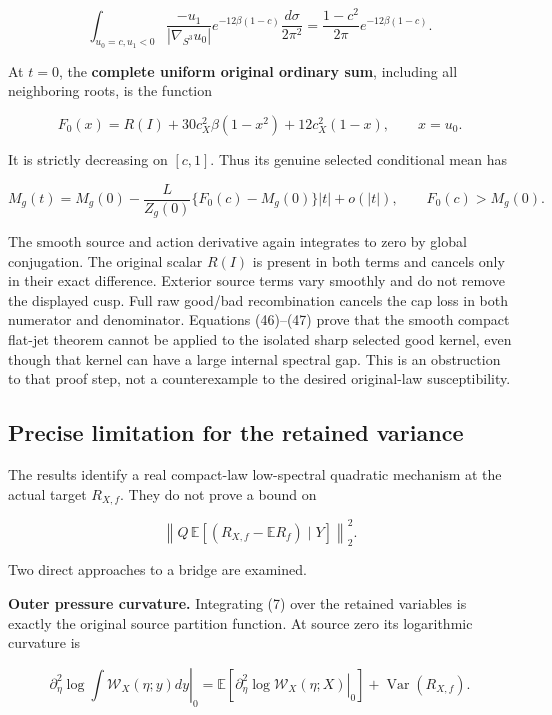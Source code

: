 \documentclass[
  11pt,
]{article}
\begin{document}
\[
 \int_{u_0=c,u_1<0}\frac{-u_1}{|\nabla_{S^3}u_0|}
     e^{-12\beta(1-c)}\frac{d\sigma}{2\pi^2}
 =\frac{1-c^2}{2\pi}e^{-12\beta(1-c)}.
\]

At \(t=0\), the \textbf{complete uniform original ordinary sum},
including all neighboring roots, is the function

\[
 F_0(x)=R(I)+30c_X^2\beta(1-x^2)+12c_X^2(1-x),
 \qquad x=u_0.
\]

It is strictly decreasing on \([c,1]\). Thus its genuine selected
conditional mean has

\[
 M_g(t)=M_g(0)
 -\frac{L}{Z_g(0)}\{F_0(c)-M_g(0)\}|t|+o(|t|),
 \qquad F_0(c)>M_g(0).                            \tag{47}
\]

The smooth source and action derivative again integrates to zero by
global conjugation. The original scalar \(R(I)\) is present in both
terms and cancels only in their exact difference. Exterior source terms
vary smoothly and do not remove the displayed cusp. Full raw good/bad
recombination cancels the cap loss in both numerator and denominator.
Equations (46)--(47) prove that the smooth compact flat-jet theorem
cannot be applied to the isolated sharp selected good kernel, even
though that kernel can have a large internal spectral gap. This is an
obstruction to that proof step, not a counterexample to the desired
original-law susceptibility.

\hypertarget{precise-limitation-for-the-retained-variance}{%
\subsection{Precise limitation for the retained
variance}\label{precise-limitation-for-the-retained-variance}}

The results identify a real compact-law low-spectral quadratic mechanism
at the actual target \(R_{X,f}\). They do not prove a bound on

\[
 \left\|Q\,\mathbb E[(R_{X,f}-\mathbb ER_f)\mid Y]\right\|_2^2.
\]

Two direct approaches to a bridge are examined.

\textbf{Outer pressure curvature.} Integrating (7) over the retained
variables is exactly the original source partition function. At source
zero its logarithmic curvature is

\[
 \left.\partial_\eta^2\log\int\mathcal W_X(\eta;y)dy\right|_0
 =\mathbb E\left[\left.\partial_\eta^2\log\mathcal W_X(\eta;X)\right|_0\right]
   +\operatorname{Var}(R_{X,f}).                  \tag{48}
\]
\end{document}

